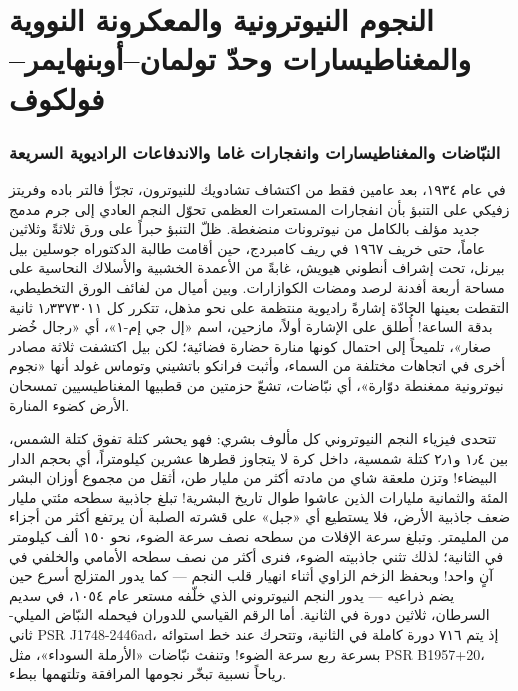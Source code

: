 \documentclass[12pt,a4paper,openany]{book}
\begin{document}
\chapter*{النجوم النيوترونية والمعكرونة النووية والمغناطيسارات وحدّ تولمان–أوبنهايمر–فولكوف}




\subsection*{النبّاضات والمغناطيسارات وانفجارات غاما والاندفاعات الراديوية السريعة}

في عام ١٩٣٤، بعد عامين فقط من اكتشاف تشادويك للنيوترون، تجرّأ فالتر باده وفريتز زفيكي على التنبؤ بأن انفجارات المستعرات العظمى تحوّل النجم العادي إلى جرم مدمج جديد مؤلف بالكامل من نيوترونات منضغطة. ظلّ التنبؤ حبراً على ورق ثلاثةً وثلاثين عاماً، حتى خريف ١٩٦٧ في ريف كامبردج، حين أقامت طالبة الدكتوراه جوسلين بيل بيرنل، تحت إشراف أنطوني هيويش، غابةً من الأعمدة الخشبية والأسلاك النحاسية على مساحة أربعة أفدنة لرصد ومضات الكوازارات. وبين أميال من لفائف الورق التخطيطي، التقطت بعينها الحادّة إشارةً راديوية منتظمة على نحو مذهل، تتكرر كل ١٫٣٣٧٣٠١١ ثانية بدقة الساعة! أُطلق على الإشارة أولاً، مازحين، اسم «إل جي إم-١»، أي «رجال خُضر صغار»، تلميحاً إلى احتمال كونها منارة حضارة فضائية؛ لكن بيل اكتشفت ثلاثة مصادر أخرى في اتجاهات مختلفة من السماء، وأثبت فرانكو باتشيني وتوماس غولد أنها «نجوم نيوترونية ممغنطة دوّارة»، أي نبّاضات، تشعّ حزمتين من قطبيها المغناطيسيين تمسحان الأرض كضوء المنارة.


تتحدى فيزياء النجم النيوتروني كل مألوف بشري: فهو يحشر كتلة تفوق كتلة الشمس، بين ١٫٤ و٢٫١ كتلة شمسية، داخل كرة لا يتجاوز قطرها عشرين كيلومتراً، أي بحجم الدار البيضاء! وتزن ملعقة شاي من مادته أكثر من مليار طن، أثقل من مجموع أوزان البشر المئة والثمانية مليارات الذين عاشوا طوال تاريخ البشرية! تبلغ جاذبية سطحه مئتي مليار ضعف جاذبية الأرض، فلا يستطيع أي «جبل» على قشرته الصلبة أن يرتفع أكثر من أجزاء من المليمتر. وتبلغ سرعة الإفلات من سطحه نصف سرعة الضوء، نحو ١٥٠ ألف كيلومتر في الثانية؛ لذلك تثني جاذبيته الضوء، فنرى أكثر من نصف سطحه الأمامي والخلفي في آنٍ واحد! وبحفظ الزخم الزاوي أثناء انهيار قلب النجم — كما يدور المتزلج أسرع حين يضم ذراعيه — يدور النجم النيوتروني الذي خلّفه مستعر عام ١٠٥٤، في سديم السرطان، ثلاثين دورة في الثانية. أما الرقم القياسي للدوران فيحمله النبّاض الميلي-ثاني PSR J1748-2446ad، إذ يتم ٧١٦ دورة كاملة في الثانية، وتتحرك عند خط استوائه بسرعة ربع سرعة الضوء! وتنفث نبّاضات «الأرملة السوداء»، مثل PSR B1957+20، رياحاً نسبية تبخّر نجومها المرافقة وتلتهمها ببطء.
\end{document}
